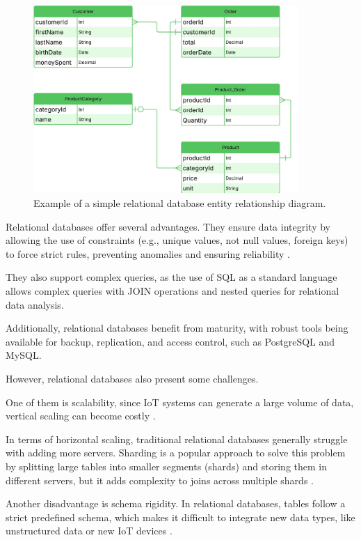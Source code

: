 \begin{figure}[H]
	\centering
	\includegraphics[width=0.9\textwidth, height=0.5\textheight, keepaspectratio]{Chapters/Figures/Databases/SQL.pdf}
	\caption{Example of a simple relational database entity relationship diagram. }
	\label{fig:databases:sql}
\end{figure}

Relational databases offer several advantages.
They ensure data integrity by allowing the use of constraints (e.g., unique values, not null values,
foreign keys) to force strict rules, preventing anomalies and ensuring
reliability \cite{bdcc7020097}.

They also support complex queries, as the use of \gls{SQL} as a standard
language allows complex queries with JOIN operations and nested queries for relational data analysis.

Additionally, relational databases benefit from maturity, with robust tools being
available for backup, replication, and access control, such as PostgreSQL and MySQL.

However, relational databases also present some challenges.

One of them is scalability, since \gls{IoT} systems can generate a large volume of
data, vertical scaling can become costly \cite{Yadav2024}.

In terms of horizontal scaling, traditional relational databases generally
struggle with adding more servers. Sharding is a popular approach to
solve this problem by splitting large tables into smaller segments (shards)
and storing them in different servers, but it adds complexity to joins
across multiple shards \cite{Yadav2024}.

Another disadvantage is schema rigidity.
In relational databases, tables follow a strict predefined schema, which
makes it difficult to integrate new data types, like unstructured
data or new \gls{IoT} devices \cite{bdcc7020097}.

